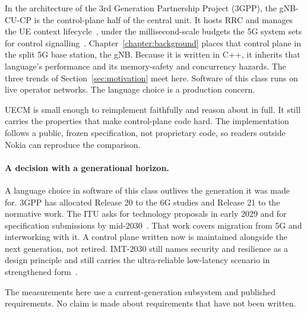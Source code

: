 \documentclass[english,oneside,a4paper,censored,csm,software-track-2020]{HYthesisML}
\begin{document}
In the architecture of the 3rd Generation Partnership Project (3GPP), the gNB-CU-CP is
the control-plane half of the central unit. It hosts RRC and manages the UE context
lifecycle~\cite{3gpp38401,3gpp38331}, under the millisecond-scale budgets the 5G system
sets for control signalling~\cite{3gpp38913}. Chapter~\ref{chapter:background} places that
control plane in the split 5G base station, the gNB. Because it is written in C++, it inherits that language's
performance and its memory-safety and concurrency hazards. The three trends of
Section~\ref{sec:motivation} meet here. Software of this class runs on live operator
networks. The language choice is a production concern.

UECM is small enough to reimplement faithfully and reason about in full. It still
carries the properties that make control-plane code hard. The implementation follows a
public, frozen specification, not proprietary code, so readers outside Nokia can
reproduce the comparison.

\paragraph{A decision with a generational horizon.}
A language choice in software of this class outlives the generation it was made for.
3GPP has allocated Release 20 to the 6G studies and Release 21 to the normative work.
The ITU asks for technology proposals in early 2029 and for specification submissions by
mid-2030~\cite{3gpp2024road6g}. That work covers migration from 5G and interworking
with it. A control plane written now is maintained alongside the next generation, not
retired. IMT-2030 still names security and resilience as a design principle and still
carries the ultra-reliable low-latency scenario in strengthened
form~\cite{itu2023imt2030}.

The measurements here use a current-generation subsystem and published requirements.
No claim is made about requirements that have not been written.
\end{document}
